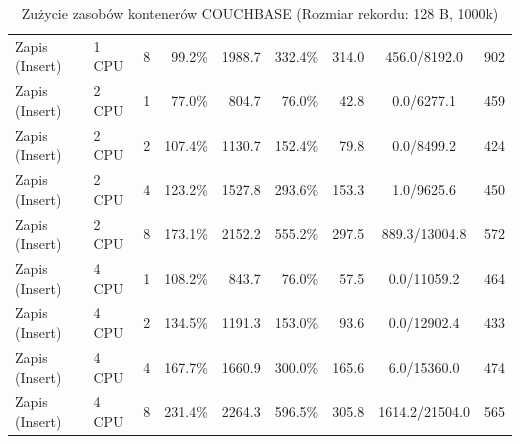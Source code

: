 \begin{table}[ht]
{\begin{tabular}{llcrrrrcc}
Zapis (Insert) & 1 CPU & 8 & 99.2\% & 1988.7 & 332.4\% & 314.0 & 456.0/8192.0 & 902 \\
Zapis (Insert) & 2 CPU & 1 & 77.0\% & 804.7 & 76.0\% & 42.8 & 0.0/6277.1 & 459 \\
Zapis (Insert) & 2 CPU & 2 & 107.4\% & 1130.7 & 152.4\% & 79.8 & 0.0/8499.2 & 424 \\
Zapis (Insert) & 2 CPU & 4 & 123.2\% & 1527.8 & 293.6\% & 153.3 & 1.0/9625.6 & 450 \\
Zapis (Insert) & 2 CPU & 8 & 173.1\% & 2152.2 & 555.2\% & 297.5 & 889.3/13004.8 & 572 \\
Zapis (Insert) & 4 CPU & 1 & 108.2\% & 843.7 & 76.0\% & 57.5 & 0.0/11059.2 & 464 \\
Zapis (Insert) & 4 CPU & 2 & 134.5\% & 1191.3 & 153.0\% & 93.6 & 0.0/12902.4 & 433 \\
Zapis (Insert) & 4 CPU & 4 & 167.7\% & 1660.9 & 300.0\% & 165.6 & 6.0/15360.0 & 474 \\
Zapis (Insert) & 4 CPU & 8 & 231.4\% & 2264.3 & 596.5\% & 305.8 & 1614.2/21504.0 & 565 \\
\bottomrule
\end{tabular}%
}
\caption{Zużycie zasobów kontenerów COUCHBASE (Rozmiar rekordu: 128 B, 1000k)}
\label{tab:resources_couchbase_small_1000000}
\end{table}
